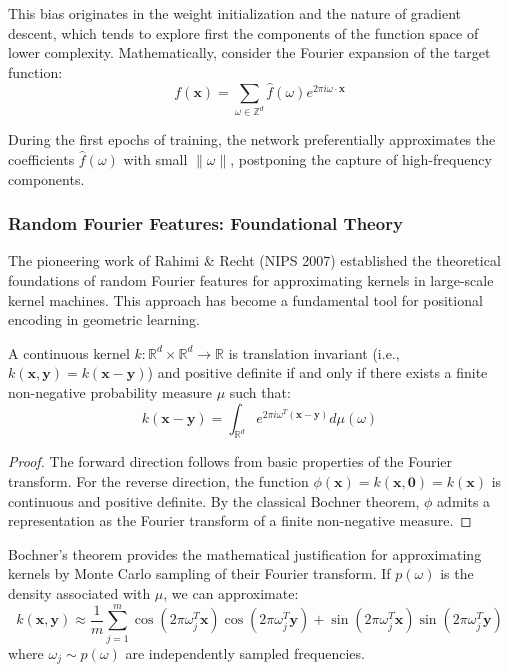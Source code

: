 This bias originates in the weight initialization and the nature of gradient descent, which tends to explore first the components of the function space of lower complexity. Mathematically, consider the Fourier expansion of the target function:
\begin{equation}
f(\mathbf{x}) = \sum_{\omega \in \mathbb{Z}^d} \hat{f}(\omega) e^{2\pi i \omega \cdot \mathbf{x}}
\end{equation}

During the first epochs of training, the network preferentially approximates the coefficients $\hat{f}(\omega)$ with small $\|\omega\|$, postponing the capture of high-frequency components.

\subsubsection{Random Fourier Features: Foundational Theory}

The pioneering work of Rahimi \& Recht (NIPS 2007) established the theoretical foundations of random Fourier features for approximating kernels in large-scale kernel machines. This approach has become a fundamental tool for positional encoding in geometric learning.

\begin{theorem}\label{thm:bochner}
A continuous kernel $k: \mathbb{R}^d \times \mathbb{R}^d \to \mathbb{R}$ is translation invariant (i.e., $k(\mathbf{x}, \mathbf{y}) = k(\mathbf{x} - \mathbf{y})$) and positive definite if and only if there exists a finite non-negative probability measure $\mu$ such that:
\begin{equation}
k(\mathbf{x} - \mathbf{y}) = \int_{\mathbb{R}^d} e^{2\pi i \omega^T (\mathbf{x} - \mathbf{y})} d\mu(\omega)
\end{equation}
\end{theorem}

\begin{proof}
The forward direction follows from basic properties of the Fourier transform. For the reverse direction, the function $\phi(\mathbf{x}) = k(\mathbf{x}, \mathbf{0}) = k(\mathbf{x})$ is continuous and positive definite. By the classical Bochner theorem, $\phi$ admits a representation as the Fourier transform of a finite non-negative measure.
\end{proof}

Bochner's theorem provides the mathematical justification for approximating kernels by Monte Carlo sampling of their Fourier transform. If $p(\omega)$ is the density associated with $\mu$, we can approximate:
\begin{equation}
k(\mathbf{x}, \mathbf{y}) \approx \frac{1}{m} \sum_{j=1}^m \cos(2\pi \omega_j^T \mathbf{x}) \cos(2\pi \omega_j^T \mathbf{y}) + \sin(2\pi \omega_j^T \mathbf{x}) \sin(2\pi \omega_j^T \mathbf{y})
\end{equation}
where $\omega_j \sim p(\omega)$ are independently sampled frequencies.

